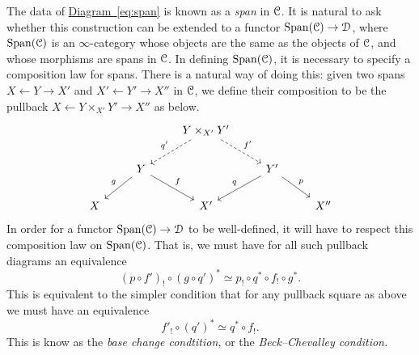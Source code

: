\documentclass[main.tex]{subfiles}
\begin{document}
The data of \hyperref[eq:span]{Diagram~\ref*{eq:span}} is known as a \emph{span} in $\mathcal{C}$. It is natural to ask whether this construction can be extended to a functor $\mathrm{Span}(\mathcal{C}) \to \mathcal{D}$, where $\mathrm{Span}(\mathcal{C})$ is an $\infty$-category whose objects are the same as the objects of $\mathcal{C}$, and whose morphisms are spans in $\mathcal{C}$. In defining $\mathrm{Span}(\mathcal{C})$, it is necessary to specify a composition law for spans. There is a natural way of doing this: given two spans $X \leftarrow Y \rightarrow X'$ and $X' \leftarrow Y' \rightarrow X''$ in $\mathcal{C}$, we define their composition to be the pullback $X \leftarrow Y \times_{X'} Y' \rightarrow X''$ as below.
\begin{equation*}
  \begin{tikzcd}
    && Y \times_{X'} Y'
    \arrow[dl, dashed, swap, "q'"]
    \arrow[dr, dashed, "f'"]
    \\
    & Y
    \arrow[dl, swap, "g"]
    \arrow[dr, "f"]
    && Y'
    \arrow[dl, swap, "q"]
    \arrow[dr, "p"]
    \\
    X
    && X'
    && X''
  \end{tikzcd}
\end{equation*}
In order for a functor $\mathrm{Span}(\mathcal{C}) \to \mathcal{D}$ to be well-defined, it will have to respect this composition law on $\mathrm{Span}(\mathcal{C})$. That is, we must have for all such pullback diagrams an equivalence
\begin{equation*}
  (p \circ f')_{!} \circ (g \circ q')^{*} \simeq p_{!} \circ q^{*} \circ f_{!} \circ g^{*}.
\end{equation*}
This is equivalent to the simpler condition that for any pullback square as above we must have an equivalence
\begin{equation*}
  f'_{!} \circ (q')^{*} \simeq q^{*} \circ f_{!}.
\end{equation*}
This is know as the \emph{base change condtition,} or the \emph{Beck--Chevalley condition.}
\end{document}
